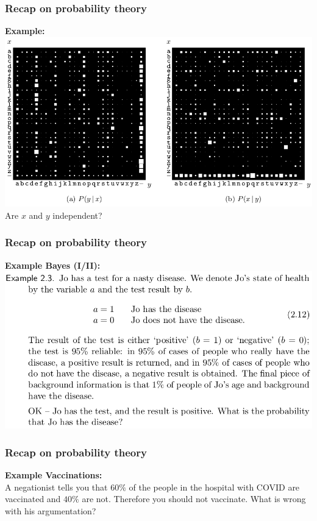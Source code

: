 \documentclass{beamer}
\begin{document}
\begin{frame}
	\frametitle{Recap on probability theory}
    \textbf{Example:}\\
   \includegraphics[width=\textwidth]{e3}
 Are $x$ and $y$ independent?
\end{frame}

\begin{frame}
	\frametitle{Recap on probability theory}
    \textbf{Example Bayes (I/II):}\\
   \includegraphics[width=\textwidth]{e4}
\end{frame}

\begin{frame}
	\frametitle{Recap on probability theory}
    \textbf{Example Vaccinations:}\\
  	A negationist tells you that $60\%$ of the people in the hospital with COVID are vaccinated and $40\%$ are not.
	Therefore you should not vaccinate.
	What is wrong with his argumentation?
\end{frame}
\end{document}
